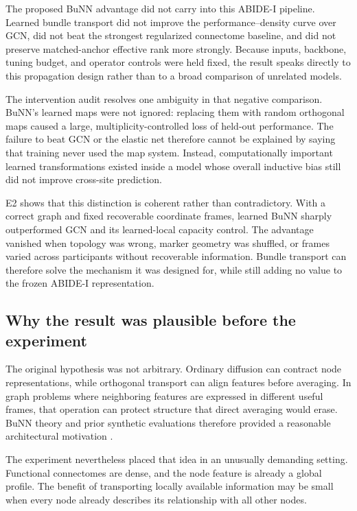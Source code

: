 \documentclass[11pt,a4paper]{article}
\begin{document}
The proposed BuNN advantage did not carry into this ABIDE-I pipeline. Learned
bundle transport did not improve the performance--density curve over GCN,
did not beat the strongest regularized connectome baseline, and did not
preserve matched-anchor effective rank more strongly. Because inputs,
backbone, tuning budget, and operator controls were held fixed, the result
speaks directly to this propagation design rather than to a broad comparison
of unrelated models.

The intervention audit resolves one ambiguity in that negative comparison.
BuNN's learned maps were not ignored: replacing them with random orthogonal
maps caused a large, multiplicity-controlled loss of held-out performance.
The failure to beat GCN or the elastic net therefore cannot be explained by
saying that training never used the map system. Instead, computationally
important learned transformations existed inside a model whose overall
inductive bias still did not improve cross-site prediction.

E2 shows that this distinction is coherent rather than contradictory. With a
correct graph and fixed recoverable coordinate frames, learned BuNN sharply
outperformed GCN and its learned-local capacity control. The advantage vanished
when topology was wrong, marker geometry was shuffled, or frames varied across
participants without recoverable information. Bundle transport can therefore
solve the mechanism it was designed for, while still adding no value to the
frozen ABIDE-I representation.

\subsection{Why the result was plausible before the experiment}

The original hypothesis was not arbitrary. Ordinary diffusion can contract
node representations, while orthogonal transport can align features before
averaging. In graph problems where neighboring features are expressed in
different useful frames, that operation can protect structure that direct
averaging would erase. BuNN theory and prior synthetic evaluations therefore
provided a reasonable architectural motivation \cite{bamberger2025bundle}.

The experiment nevertheless placed that idea in an unusually demanding
setting. Functional connectomes are dense, and the node feature is already a
global profile. The benefit of transporting locally available information may
be small when every node already describes its relationship with all other
nodes.
\end{document}
